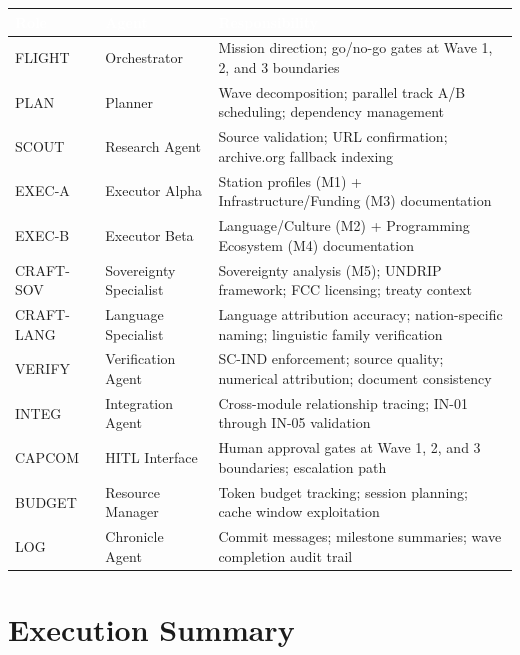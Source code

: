 \documentclass[11pt,letterpaper]{article}
\newcommand{\tableheader}[1]{\textbf{\sffamily\textcolor{white}{#1}}}
\begin{document}
\begin{center}
\begin{tabularx}{\textwidth}{L{1.8cm}L{2.8cm}X}
\toprule
{}
\tableheader{Role} & \tableheader{Agent} & \tableheader{Responsibility} \\
\midrule
FLIGHT & Orchestrator & Mission direction; go/no-go gates at Wave 1, 2, and 3 boundaries \\
PLAN & Planner & Wave decomposition; parallel track A/B scheduling; dependency management \\
SCOUT & Research Agent & Source validation; URL confirmation; archive.org fallback indexing \\
EXEC-A & Executor Alpha & Station profiles (M1) + Infrastructure/Funding (M3) documentation \\
EXEC-B & Executor Beta & Language/Culture (M2) + Programming Ecosystem (M4) documentation \\
CRAFT-SOV & Sovereignty Specialist & Sovereignty analysis (M5); UNDRIP framework; FCC licensing; treaty context \\
CRAFT-LANG & Language Specialist & Language attribution accuracy; nation-specific naming; linguistic family verification \\
VERIFY & Verification Agent & SC-IND enforcement; source quality; numerical attribution; document consistency \\
INTEG & Integration Agent & Cross-module relationship tracing; IN-01 through IN-05 validation \\
CAPCOM & HITL Interface & Human approval gates at Wave 1, 2, and 3 boundaries; escalation path \\
BUDGET & Resource Manager & Token budget tracking; session planning; cache window exploitation \\
LOG & Chronicle Agent & Commit messages; milestone summaries; wave completion audit trail \\
\bottomrule
\end{tabularx}
\end{center}

\section{Execution Summary}
\end{document}
